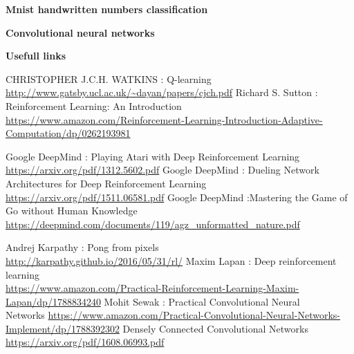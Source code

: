 \documentclass[xcolor=dvipsnames]{beamer}
\begin{document}
\begin{frame}{\bf Mnist handwritten numbers classification}
\begin{itemize}
\end{itemize}

\end{frame}


\begin{frame}{\bf Convolutional neural networks}
\end{frame}


\begin{frame}{\bf Usefull links}

{\tiny
  \begin{thebibliography}{9}
    \bibitem {}CHRISTOPHER  J.C.H. WATKINS : Q-learning \\ \url{http://www.gatsby.ucl.ac.uk/~dayan/papers/cjch.pdf}
    \bibitem {}Richard S. Sutton : Reinforcement Learning: An Introduction \\ \url{https://www.amazon.com/Reinforcement-Learning-Introduction-Adaptive-Computation/dp/0262193981}

    \bibitem {}Google DeepMind : Playing Atari with Deep Reinforcement Learning \\ \url{https://arxiv.org/pdf/1312.5602.pdf}
    \bibitem {}Google DeepMind : Dueling Network Architectures for Deep Reinforcement Learning \\ \url{https://arxiv.org/pdf/1511.06581.pdf}
    \bibitem {}Google DeepMind :Mastering the Game of Go without Human Knowledge \\ \url{https://deepmind.com/documents/119/agz_unformatted\_nature.pdf}

    \bibitem {}Andrej Karpathy : Pong from pixels \\ \url{http://karpathy.github.io/2016/05/31/rl/}
    \bibitem {}Maxim Lapan : Deep reinforcement learning \\ \url{https://www.amazon.com/Practical-Reinforcement-Learning-Maxim-Lapan/dp/1788834240}
    \bibitem {}Mohit Sewak : Practical Convolutional Neural \\ Networks \url{https://www.amazon.com/Practical-Convolutional-Neural-Networks-Implement/dp/1788392302}
    \bibitem {}Densely Connected Convolutional Networks \\ \url{https://arxiv.org/pdf/1608.06993.pdf}
  \end{thebibliography}
}

\end{frame}
\end{document}
